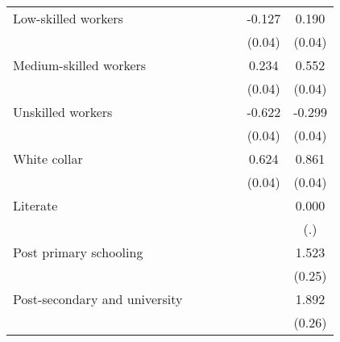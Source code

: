 {\begin{tabular}{l*{6}{c}}
Low-skilled workers &                     &                     &                     &                     &      -0.127\sym{***}&       0.190\sym{***}\\
                    &                     &                     &                     &                     &      (0.04)         &      (0.04)         \\
Medium-skilled workers&                     &                     &                     &                     &       0.234\sym{***}&       0.552\sym{***}\\
                    &                     &                     &                     &                     &      (0.04)         &      (0.04)         \\
Unskilled workers   &                     &                     &                     &                     &      -0.622\sym{***}&      -0.299\sym{***}\\
                    &                     &                     &                     &                     &      (0.04)         &      (0.04)         \\
White collar        &                     &                     &                     &                     &       0.624\sym{***}&       0.861\sym{***}\\
                    &                     &                     &                     &                     &      (0.04)         &      (0.04)         \\
Literate            &                     &                     &                     &                     &                     &       0.000         \\
                    &                     &                     &                     &                     &                     &         (.)         \\
Post primary schooling&                     &                     &                     &                     &                     &       1.523\sym{***}\\
                    &                     &                     &                     &                     &                     &      (0.25)         \\
Post-secondary and university&                     &                     &                     &                     &                     &       1.892\sym{***}\\
                    &                     &                     &                     &                     &                     &      (0.26)         \\

\end{tabular}}
